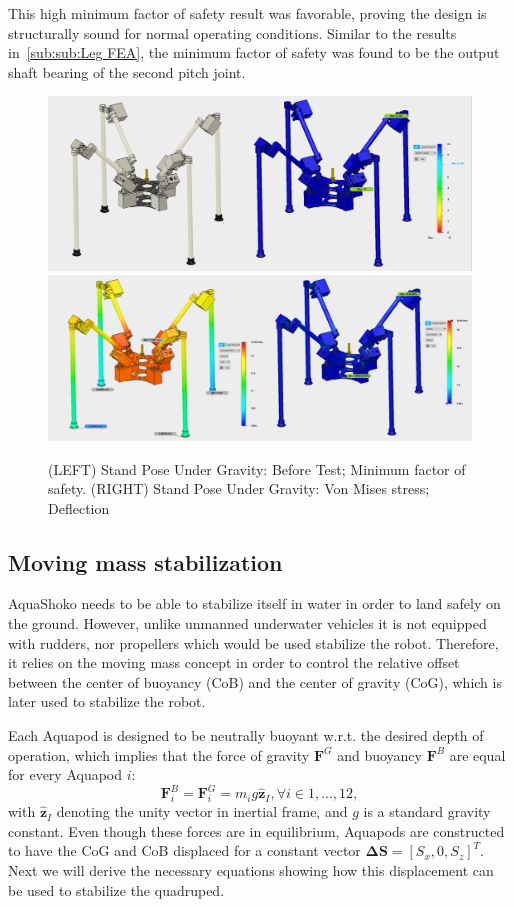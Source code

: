 This high minimum factor of safety result was favorable, proving the design is structurally sound for normal operating conditions. Similar to the results in~\ref{sub:sub:Leg FEA}, the minimum factor of safety was found to be the output shaft bearing of the second pitch joint.





 
\begin{figure}
\centering
\includegraphics[width=0.5\columnwidth]{./img/aquaShoko-v3dot3-FEA-Standing-1.png}\includegraphics[width=0.5\columnwidth]{./img/aquaShoko-v3dot3-FEA-Standing-2.png}
\caption{(LEFT) Stand Pose Under Gravity: Before Test; Minimum factor of safety.  (RIGHT) Stand Pose Under Gravity: Von Mises stress; Deflection }
\label{fig:test two pressure check}\label{fig:PressureCheck2}
\end{figure}




\subsection{Moving mass stabilization}\label{sec:stable}
AquaShoko needs to be able to stabilize itself in water in order to land safely on the ground. However, unlike unmanned underwater vehicles it is not equipped with rudders, nor propellers which would be used stabilize the robot. Therefore, it relies on the moving mass concept in order to control the relative offset between the center of buoyancy (CoB) and the center of gravity (CoG), which is later used to stabilize the robot.

Each Aquapod is designed to be neutrally buoyant w.r.t. the desired depth of operation, which implies that the force of gravity $\textbf{F}^G$ and buoyancy $\textbf{F}^B$ are equal for every Aquapod $i$:
\begin{equation}\label{eq:equilibrium}
\textbf{F}^B_i=\textbf{F}^G_i=m_i g \hat{\textbf{z}}_I, \forall i \in 1,...,12,
\end{equation}
with $\hat{\textbf{z}}_I$ denoting the unity vector in inertial frame, and $g$ is a standard gravity constant. Even though these forces are in equilibrium, Aquapods are constructed to have the CoG and CoB displaced for a constant vector $\boldsymbol{\Delta}\textbf{S}=[S_x, 0, S_z]^T$. Next we will derive the necessary equations showing how this displacement can be used to stabilize the quadruped.

